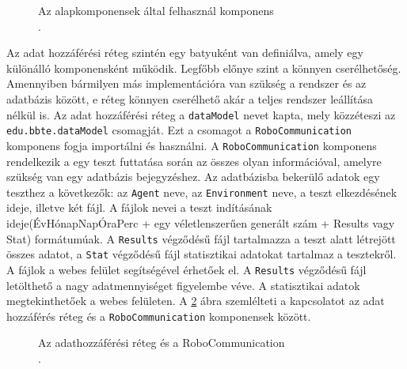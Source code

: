 \begin{figure}[h!]
  \centering
  \caption[Az alapkomponensek által felhasznál komponens]%
  {Az alapkomponensek által felhasznál komponens\\
  {\white .}\hfill\url{}}
  \label{fig:PackagesKomponens}
\end{figure}


Az adat hozzáférési réteg szintén egy batyuként van definiálva, amely egy különálló komponensként működik. Legfőbb előnye szint a könnyen cserélhetőség. Amennyiben bármilyen más implementációra van szükség a rendszer és az adatbázis között, e réteg könnyen cserélhető akár a teljes rendszer leállítása nélkül is. Az adat hozzáférési réteg a \texttt{dataModel} nevet kapta, mely közzéteszi az \texttt{edu.bbte.dataModel} csomagját. Ezt a csomagot a \texttt{RoboCommunication} komponens fogja importálni és használni. A \texttt{RoboCommunication} komponens rendelkezik a egy teszt futtatása során az összes olyan információval, amelyre szükség van egy adatbázis bejegyzéshez. Az adatbázisba bekerülő adatok egy teszthez a következők: az \texttt{Agent} neve, az \texttt{Environment} neve, a teszt elkezdésének ideje, illetve két fájl. A fájlok nevei a teszt indításának ideje(ÉvHónapNapÓraPerc + egy véletlenszerűen generált szám + Results vagy Stat) formátumúak. A \texttt{Results} végződésű fájl tartalmazza a teszt alatt létrejött összes adatot, a \texttt{Stat} végződésű fájl statisztikai adatokat tartalmaz a tesztekről. A fájlok a webes felület segítségével érhetőek el. A \texttt{Results} végződésű fájl letölthető a nagy adatmennyiséget figyelembe véve. A statisztikai adatok megtekinthetőek a webes felületen. A \ref{fig:dataModelRobo} ábra szemlélteti a kapcsolatot az adat hozzáférés réteg és a \texttt{RoboCommunication} komponensek között. 

\begin{figure}[h!]
  \centering
  \caption[Az adathozzáférési réteg és a RoboCommunication]%
  {Az adathozzáférési réteg és a RoboCommunication\\
  {\white .}\hfill\url{}}
  \label{fig:dataModelRobo}
\end{figure}

